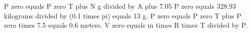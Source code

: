 P zero equals P zero T plus N g divided by A plus 7.05 P zero equals 328.93 kilograms divided by (0.1 times pi) equals 13 g.  
P zero equals P zero T plus P zero times 7.5 equals 0.6 meters.  
V zero equals m times R times T divided by P.